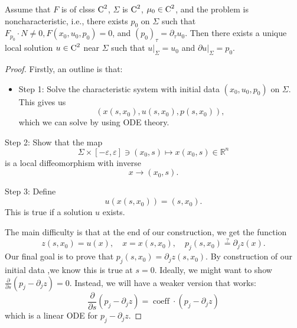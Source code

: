 \begin{theorem}
    Assume that $F$ is of clsss $\operatorname{C}^2$, $\Sigma$ is $\operatorname{C}^2$, $\mu_0\in \operatorname{C}^2$, and the problem is noncharacteristic, i.e., there exists $p_0$ on $\Sigma$ such that $F_{p_0}\cdot N \neq 0, F(x_0, u_0, p_0)=0$, and $(p_0)_\tau = \partial_\tau u_0$. Then there exists a unique local solution $u\in \operatorname{C}^2$ near $\Sigma$ such that $u|_\Sigma= u_0$ and $\partial u|_\Sigma = p_0$.
\end{theorem}
\begin{proof}
    Firstly, an outline is that: 
    \begin{itemize}
        \item Step 1: Solve the characteristic system with initial data $(x_0, u_0, p_0)$ on $\Sigma$. This gives us 
        \[
            (x(s,x_0), u(s,x_0), p(s,x_0)),
        \]
        which we can solve by using ODE theory.
    \end{itemize}
    \item Step 2: Show that the map 
    \[
        \Sigma \times[-\varepsilon, \varepsilon] \ni\left(x_{0}, s\right) \mapsto x\left(x_{0}, s\right) \in \mathbb{R}^{n}
    \]
    is a local diffeomorphism with inverse 
    \[
        x\to (x_0, s).
    \]
    \item Step 3: Define 
    \[
        u(x(s,x_0)) = (s,x_0).
    \]
    This is true if a solution $u$ exists. 

    The main difficulty is that at the end of our construction, we get the function 
    \[
        z\left(s, x_{0}\right)=u(x), \quad x=x\left(s, x_{0}\right), \quad p_{j}\left(s, x_{0}\right) \stackrel{?}{=} \partial_{j} z(x).
    \]
    Our final goal is to prove that $p_j(s,x_0) = \partial_j z(s,x_0).$ By construction of our initial data ,we know this is true at $s=0$. Ideally, we might want to show $\frac \partial {\partial s}(p_j - \partial_j z)=0$. Instead, we will have a weaker version that works: 
    \[
        \frac{\partial}{\partial s}\left(p_{j}-\partial_{j} z\right)=\operatorname{coeff} \cdot \left(p_{j}-\partial_{j} z\right)
    \]
    which is a linear ODE for $p_j - \partial_j z$. 


\end{proof}
